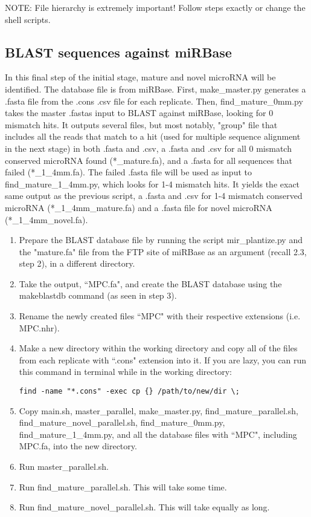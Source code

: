 \documentclass[12pt,titlepage]{article}
\begin{document}
\noindent NOTE: File hierarchy is extremely important! Follow steps exactly or change the shell scripts. 

\subsection{BLAST sequences against miRBase}
In this final step of the initial stage, mature and novel microRNA will be identified. The database file is from miRBase. First, make\_master.py generates a .fasta file from the .cons .csv file for each replicate. Then, find\_mature\_0mm.py takes the master .fastas input to BLAST against miRBase, looking for 0 mismatch hits. It outputs several files, but most notably, "group" file that includes all the reads that match to a hit (used for multiple sequence alignment in the next stage) in both .fasta and .csv, a .fasta and .csv for all 0 mismatch conserved microRNA found (*\_mature.fa), and a .fasta for all sequences that failed (*\_1\_4mm.fa). The failed .fasta file will be used as input to find\_mature\_1\_4mm.py, which looks for 1-4 mismatch hits. It yields the exact same output as the previous script, a .fasta and .csv for 1-4 mismatch conserved microRNA (*\_1\_4mm\_mature.fa) and a .fasta file for novel microRNA (*\_1\_4mm\_novel.fa).
\begin{enumerate}
\item Prepare the BLAST database file by running the script mir\_plantize.py and the "mature.fa" file from the FTP site of miRBase as an argument (recall 2.3, step 2), in a different directory.
\item Take the output, ``MPC.fa", and create the BLAST database using the makeblastdb command (as seen in step 3).
\item Rename the newly created files ``MPC" with their respective extensions (i.e. MPC.nhr).
\item Make a new directory within the working directory and copy all of the files from each replicate with ``.cons" extension into it. If you are lazy, you can run this command in terminal while in the working directory: 
\begin{tcolorbox}
\begin{lstlisting}
find -name "*.cons" -exec cp {} /path/to/new/dir \; 
\end{lstlisting}
\end{tcolorbox}
\item Copy main.sh, master\_parallel, make\_master.py, find\_mature\_parallel.sh, find\_mature\_novel\_parallel.sh, find\_mature\_0mm.py, find\_mature\_1\_4mm.py, and all the database files with ``MPC", including MPC.fa, into the new directory.
\item Run master\_parallel.sh.
\item Run find\_mature\_parallel.sh. This will take some time.
\item Run find\_mature\_novel\_parallel.sh. This will take equally as long.
\end{enumerate}
\end{document}
